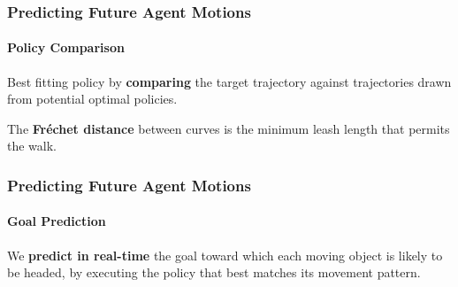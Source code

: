 \begin{frame}
	\frametitle{Predicting Future Agent Motions}
	\framesubtitle{Policy Comparison}
	
	\Large
	
	\vspace{0.3cm}
	
	Best fitting policy by \textbf{comparing} the target trajectory against trajectories drawn from
	potential optimal policies.
	
	\vspace{-0.3cm}
	
	\begin{center}
	\end{center}
	
	\vspace{-0.5cm}
	
	The \textbf{Fr\'echet distance} between curves is the minimum leash length that permits the walk.\\
\end{frame}

\begin{frame}
	\frametitle{Predicting Future Agent Motions}
	\framesubtitle{Goal Prediction}
	
	\Large
	
	\vspace{0.25cm}
	
	We \textbf{predict in real-time} the goal toward which each moving object is likely to be headed,
	by executing the policy that best matches its movement pattern.
	
	\vspace{-0.1cm}
	
	\begin{center}
	\end{center}
\end{frame}

